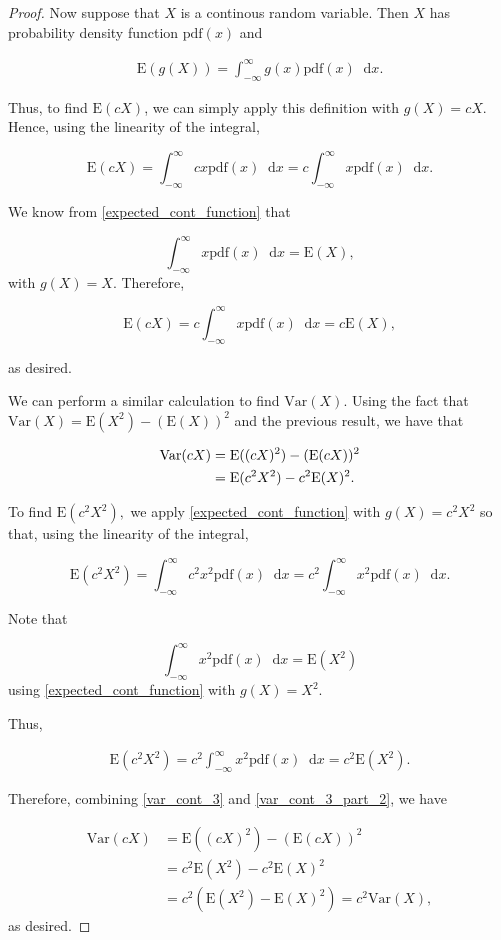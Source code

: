 \documentclass[12pt]{article}
\theoremstyle{definition}
\newcommand{\E}{\text{E}}
\newcommand{\V}{\text{Var}}
\newcommand{\pdf}{\text{pdf}}
\newcommand*\diff{\mathop{}\!\mathrm{d}}
\begin{document}
\begin{proof}
  Now suppose that $X$ is a continous random variable. Then $X$ has probability
  density function $\pdf(x)$ and

  \begin{align}\label{expected_cont_function}
    \E(g(X)) = \int_{-\infty}^{\infty} g(x) \pdf(x) \diff x.
  \end{align}

  Thus, to find $\E(cX)$, we can simply apply this definition with $g(X) = cX.$
  Hence, using the linearity of the integral,

  \[
    \E(cX) = \int_{-\infty}^{\infty} cx \pdf(x) \diff x = c \int_{-\infty}^{\infty} x \pdf(x) \diff x.
  \]

  We know from \eqref{expected_cont_function} that

  \[
    \int_{-\infty}^{\infty} x \pdf(x) \diff x = \E(X),
  \]
  with $g(X) = X.$ Therefore,

  \[
    \E(cX) = c \int_{-\infty}^{\infty} x \pdf(x) \diff x = c\E(X),
  \]

  as desired.

  We can perform a similar calculation to find $\V(X).$ Using the fact that
  $\V(X) = \E(X^2) - (\E(X))^2$ and the previous result, we have that

  \begin{align}\label{var_cont_3}
    \V(cX) &= \E((cX)^2) - (\E(cX))^2 \notag \\
    &= \E(c^2X^2) - c^2\E(X)^2.
  \end{align}

  To find $\E(c^2X^2),$ we apply \eqref{expected_cont_function} with
  $g(X) = c^2X^2$ so that, using the linearity of the integral,

  \[
    \E(c^2X^2) = \int_{-\infty}^{\infty} c^2x^2 \pdf(x) \diff x = c^2 \int_{-\infty}^{\infty} x^2 \pdf(x) \diff x.
  \]

  Note that

  \[
    \int_{-\infty}^{\infty} x^2 \pdf(x) \diff x = \E(X^2)
  \]
  using \eqref{expected_cont_function} with $g(X) = X^2.$

  Thus,

  \begin{align}\label{var_cont_3_part_2}
    \E(c^2X^2) = c^2\int_{-\infty}^{\infty} x^2 \pdf(x) \diff x = c^2\E(X^2).
  \end{align}

  Therefore, combining \eqref{var_cont_3} and \eqref{var_cont_3_part_2},
  we have

  \begin{align*}
    \V(cX)
    &= \E((cX)^2) - (\E(cX))^2 \\
    &= c^2\E(X^2) - c^2\E(X)^2 \\
    &= c^2(\E(X^2) - \E(X)^2) = c^2\V(X),
  \end{align*}
  as desired.
\end{proof}
\end{document}
